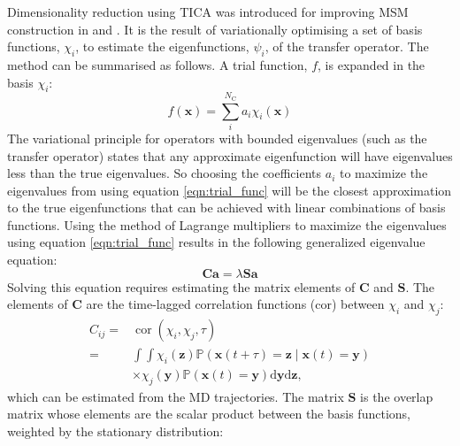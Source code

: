Dimensionality reduction using TICA was introduced for improving MSM construction in \cite{perez-hernandezIdentificationSlowMolecular2013a} and  \cite{schwantesImprovementsMarkovState2013}. It is the result of variationally optimising a set of basis functions, $\chi_{i}$, to estimate the eigenfunctions, $\psi_{i}$, of the transfer operator. The method can be summarised as follows. A trial function, $f$, is expanded in the basis $\chi_{i}$: 
\begin{equation}\label{eqn:trial_func}
    f(\mathbf{x}) = \sum^{N_{\mathrm{C}}}_{i}a_{i}\chi_{i}(\mathbf{x})
\end{equation}
The variational principle for operators with bounded eigenvalues (such as the transfer operator) states that any approximate eigenfunction will have eigenvalues less than the true eigenvalues.\cite{nuskeVariationalApproachConformational2017}\cite{noeVariationalApproachModeling2013} So choosing the coefficients $a_{i}$ to maximize the eigenvalues from using equation \ref{eqn:trial_func} will be the closest approximation to the true eigenfunctions that can be achieved with linear combinations of basis functions. Using the method of Lagrange multipliers to maximize the eigenvalues using equation \ref{eqn:trial_func} results in the following generalized eigenvalue equation: \cite{nuskeVariationalApproachConformational2017} \begin{equation}\label{eqn:general_ev_equation}
    \mathbf{C}\mathbf{a} = \lambda \mathbf{S}\mathbf{a}
\end{equation}
Solving this equation requires estimating the matrix elements of $\mathbf{C}$ and $\mathbf{S}$. The elements of $\mathbf{C}$ are the time-lagged correlation functions ($\mathrm{cor}$) between $\chi_{i}$ and $\chi_{j}$: \cite{nuskeVariationalApproachConformational2017}
\begin{equation}
    \begin{split}
        C_{ij} =& \operatorname{cor}\left(\chi_{i}, \chi_{j}, \tau\right)\\
        =& \int \int \chi_{i}(\mathbf{z}) \mathbb{P}\left(\mathbf{x}(t+\tau)=\mathbf{z} \mid \mathbf{x}(t)=\mathbf{y}\right) \\
        & \times \chi_{j}(\mathbf{y}) \mathbb{P}\left(\mathbf{x}(t)=\mathbf{y}\right) \mathrm{d} \mathbf{y} \mathrm{d}\mathbf{z},        
    \end{split}
\end{equation}
which can be estimated from the MD trajectories. The matrix $\mathbf{S}$ is the overlap matrix whose elements are the scalar product between the basis functions, weighted by the stationary distribution: \cite{nuskeVariationalApproachMolecular2014}
